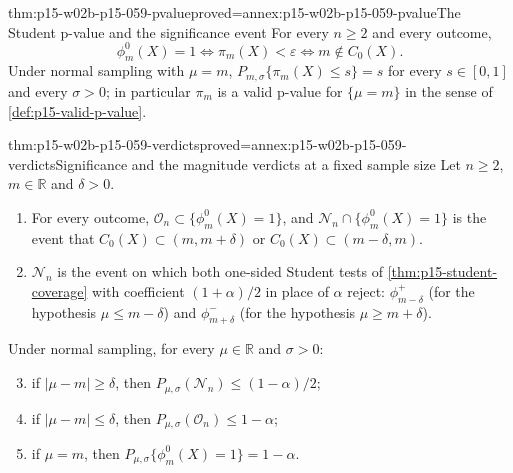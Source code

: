 \begin{hblemma}{thm:p15-w02b-p15-059-pvalue}{proved=annex:p15-w02b-p15-059-pvalue}{The Student p-value and the significance event}
For every \(n\geq2\) and every outcome,
\[
 \phi_m^0(X)=1\iff\pi_m(X)<\varepsilon\iff m\notin C_0(X).
\]
Under normal sampling with \(\mu=m\), \(P_{m,\sigma}\{\pi_m(X)\leq s\}=s\)
for every \(s\in[0,1]\) and every \(\sigma>0\); in particular \(\pi_m\) is
a valid p-value for \(\{\mu=m\}\) in the sense of
\cref{def:p15-valid-p-value}.
\end{hblemma}

\begin{hbtheorem}{thm:p15-w02b-p15-059-verdicts}{proved=annex:p15-w02b-p15-059-verdicts}{Significance and the magnitude verdicts at a fixed sample size}
Let \(n\geq2\), \(m\in\mathbb R\) and \(\delta>0\).
\begin{enumerate}
\item For every outcome, \(\mathcal O_n\subset\{\phi_m^0(X)=1\}\), and
\(\mathcal N_n\cap\{\phi_m^0(X)=1\}\) is the event that \(C_0(X)\subset
(m,m+\delta)\) or \(C_0(X)\subset(m-\delta,m)\).
\item \(\mathcal N_n\) is the event on which both one-sided Student tests of
\cref{thm:p15-student-coverage} with coefficient \((1+\alpha)/2\) in place
of \(\alpha\) reject: \(\phi_{m-\delta}^+\) (for the hypothesis
\(\mu\leq m-\delta\)) and \(\phi_{m+\delta}^-\) (for the hypothesis
\(\mu\geq m+\delta\)).
\end{enumerate}
Under normal sampling, for every \(\mu\in\mathbb R\) and \(\sigma>0\):
\begin{enumerate}
\setcounter{enumi}{2}
\item if \(|\mu-m|\geq\delta\), then \(P_{\mu,\sigma}(\mathcal N_n)\leq
(1-\alpha)/2\);
\item if \(|\mu-m|\leq\delta\), then \(P_{\mu,\sigma}(\mathcal O_n)\leq
1-\alpha\);
\item if \(\mu=m\), then \(P_{\mu,\sigma}\{\phi_m^0(X)=1\}=1-\alpha\).
\end{enumerate}
\end{hbtheorem}

